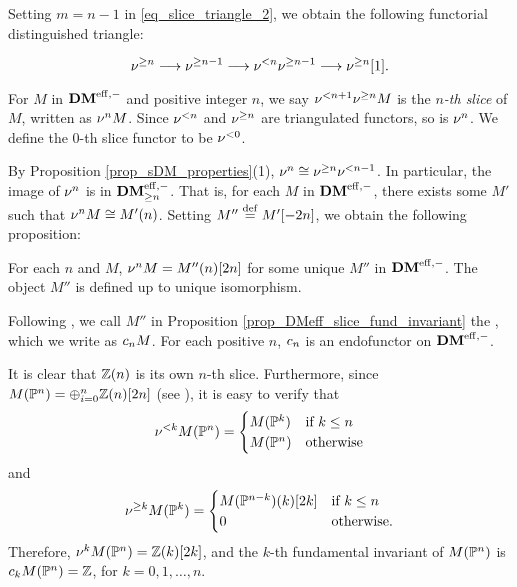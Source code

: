 Setting $m = n - 1$ in \eqref{eq_slice_triangle_2}, we obtain the
following functorial distinguished triangle:

\begin{equation}\label{eq_slice_triangle_3}
\sgDM{n} \to \sgDM{n - 1} \to \slDM{n} \sgDM{n - 1}
\to \sgDM{n}[1].
\end{equation}

\begin{defn}\label{def_slice_functors_DMeff}
For $M$ in $\DMeff$ and positive integer $n$, we say 
$\slDM{n+1}\sgDM{n}M$ is the \emph{$n$-th slice} of $M$, written 
as $\sliceDM{n}M$. Since $\slDM{n}$ and $\sgDM{n}$ are 
triangulated functors, so is $\sliceDM{n}$. We define the $0$-th
slice functor to be $\slDM{0}$.
\end{defn}

By Proposition \ref{prop_sDM_properties}(1), $\sliceDM{n} \cong
\sgDM{n}\slDM{n - 1}$. In particular, the image of
$\sliceDM{n}$ is in $\GFiltDM[n]{\DMeff}$. That is, for each $M$ in 
$\DMeff$, there exists some $M'$ such that $\sliceDM{n}M \cong 
\tZ[n]{M'}$. Setting $M'' \defeq M'[-2n]$, we obtain the following 
proposition:

\begin{prop}
\label{prop_DMeff_slice_fund_invariant}
For each $n$ and $M$, $\sliceDM{n}M = \tZ[n]{M''}[2n]$ for some 
unique $M''$ in $\DMeff$. The object $M''$ is defined up to
unique isomorphism.
\end{prop}

\begin{defn}\label{def_DM_fund_invariant}
Following \loccit, we call $M''$ in Proposition
\ref{prop_DMeff_slice_fund_invariant} the , which we write as $\fIDM{n}M$. For each positive 
$n$, $\fIDM{n}$ is an endofunctor on $\DMeff$.
\end{defn}

\begin{ex}\label{ex_sfilt_MPn}
It is clear that $\Z(n)$ is its own $n$-th slice. Furthermore,
since $M(\P^n) = \oplus_{i = 0}^n \Z(n)[2n]$ (see 
\cite[15.5]{MVW}), it is easy to verify that 
\[
\slDM{k}M(\P^n) = \begin{cases}
M(\P^k) & \textrm{if }k \leq n \\
M(\P^n) & \textrm{otherwise}
\end{cases}
\]
and 
\[
\sgDM{k}M(\P^k) = \begin{cases}
\tZ[k]{M(\P^{n - k})}[2k] & \textrm{if }k \leq n\\
0 & \textrm{otherwise}.
\end{cases}
\]
Therefore, $\sliceDM{k} M(\P^n) = \Z(k)[2k]$, and the $k$-th
fundamental invariant of $M(\P^n)$ is $\fIDM{k}M(\P^n) = \Z$,
for $k = 0,1,\dots,n$.
\end{ex}

